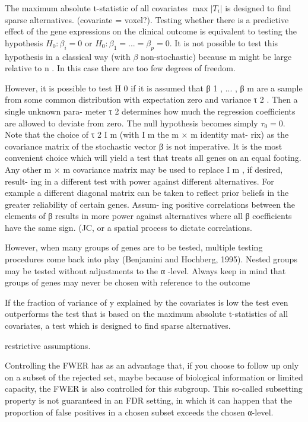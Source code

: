 \documentclass{article}
\begin{document}
The maximum absolute t-statistic of all covariates $\max|T_i|$  is designed to find sparse alternatives. (covariate = voxel?).
Testing  whether  there  is  a  predictive  effect  of  the  gene expressions on the clinical outcome is equivalent to testing the hypothesis $H_0: \beta_i=0$ or $H_0: \beta_1=...=\beta_p=0$. It is not possible to test this hypothesis in a classical way (with $\beta$ non-stochastic) because m might be large relative to n . In this case there are too few degrees of freedom. 

However,  it  is  possible  to  test H 0 if  it  is  assumed  that β 1 , ...  , β m are a sample from some common distribution with expectation zero and variance τ 2 . Then a single unknown para- meter τ 2 determines how much the regression coefficients are allowed to deviate from zero.  The null hypothesis becomes simply $\tau_0=0$.
Note that the choice of τ 2 I m (with I m the m × m identity mat- rix) as the covariance matrix of the stochastic vector β is not imperative. It is the most convenient choice which will yield a test that treats all genes on an equal footing. Any other m × m covariance matrix may be used to replace I m , if desired, result- ing in a different test with power against different alternatives.  For example a different diagonal matrix can be taken to reflect prior beliefs in the greater reliability of certain genes. Assum- ing positive correlations between the elements of β results in more power against alternatives where all β coefficients have the same sign. (JC, or a spatial process to dictate correlations.

However, when many groups of genes are to be tested, multiple testing procedures come back into play (Benjamini and Hochberg, 1995). Nested groups may be tested without adjustments to the α -level. Always keep in mind that groups of genes may never be chosen with reference to the  outcome 

If the fraction of variance of y explained by the covariates is low the test even outperforms the test that is based on the maximum absolute t-statistics of all covariates, a test which is designed to find sparse alternatives. 

restrictive assumptions.
 
Controlling the FWER has as an advantage that, if you choose to follow up only on a subset of the rejected set, maybe because of biological information or limited capacity, the FWER is also controlled for this subgroup. This so-called subsetting property is not guaranteed in an FDR setting, in which it can happen that the proportion of false positives in a chosen subset exceeds the chosen α-level. 
\end{document}
